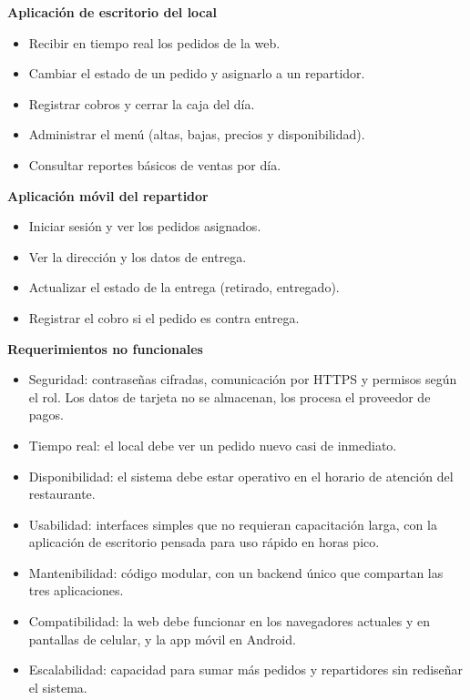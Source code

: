 \documentclass[12pt,a4paper]{report}
\begin{document}
\vspace{0.5cm}
\textbf{Aplicación de escritorio del local}
\begin{itemize}
	\item Recibir en tiempo real los pedidos de la web.
	\item Cambiar el estado de un pedido y asignarlo a un repartidor.
	\item Registrar cobros y cerrar la caja del día.
	\item Administrar el menú (altas, bajas, precios y disponibilidad).
	\item Consultar reportes básicos de ventas por día.	
\end{itemize}

\vspace{0.5cm}
\textbf{Aplicación móvil del repartidor}
\begin{itemize}
	\item Iniciar sesión y ver los pedidos asignados.
	\item Ver la dirección y los datos de entrega.
	\item Actualizar el estado de la entrega (retirado, entregado).
	\item Registrar el cobro si el pedido es contra entrega.
\end{itemize}

\vspace{0.5cm}
\begin{center}
	\textbf{Requerimientos no funcionales}
\end{center}
\vspace{0.5cm}

\begin{itemize}
	\item Seguridad: contraseñas cifradas, comunicación por HTTPS y permisos según el rol. Los datos de tarjeta no se almacenan, los procesa el proveedor de pagos.
	\item Tiempo real: el local debe ver un pedido nuevo casi de inmediato.
	\item Disponibilidad: el sistema debe estar operativo en el horario de atención del restaurante.
	\item Usabilidad: interfaces simples que no requieran capacitación larga, con la aplicación de escritorio pensada para uso rápido en horas pico.
	\item Mantenibilidad: código modular, con un backend único que compartan las tres aplicaciones.
	\item Compatibilidad: la web debe funcionar en los navegadores actuales y en pantallas de celular, y la app móvil en Android.
	\item Escalabilidad: capacidad para sumar más pedidos y repartidores sin rediseñar el sistema.	
\end{itemize}
\end{document}
